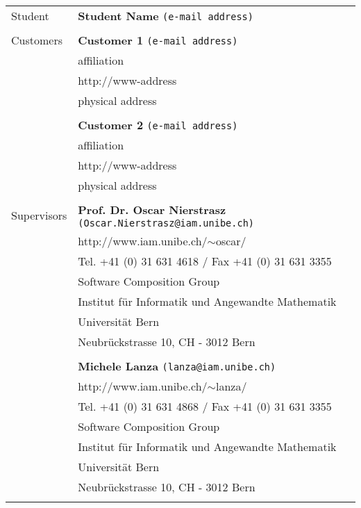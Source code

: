 \documentclass[10pt]{article}
\begin{document}
\begin{table}[ht]
\begin{tabular}{p{3cm}p{12cm}}
Student               & {\bf Student Name} {\tt (e-mail address)}\\
                      & \\
Customers             & {\bf Customer 1} {\tt (e-mail address)}\\
                      & affiliation\\
                      & http://www-address\\
                      & physical address\\
                      & \\
                      & {\bf Customer 2} {\tt (e-mail address)}\\
                      & affiliation\\
                      & http://www-address\\
                      & physical address\\
                      & \\    
Supervisors           & {\bf Prof. Dr. Oscar Nierstrasz} {\tt (Oscar.Nierstrasz@iam.unibe.ch)}\\ 
                      & http://www.iam.unibe.ch/$\sim$oscar/\\
                      & Tel. +41 (0) 31 631 4618 / Fax +41 (0) 31 631 3355\\
                      & Software Composition Group\\
                      & Institut f\"ur Informatik und Angewandte Mathematik\\
                      & Universit\"at Bern\\
                      & Neubr\"{u}ckstrasse 10, CH - 3012 Bern\\
                      & \\
                      & {\bf Michele Lanza} {\tt (lanza@iam.unibe.ch)}\\ 
                      & http://www.iam.unibe.ch/$\sim$lanza/\\
                      & Tel. +41 (0) 31 631 4868 / Fax +41 (0) 31 631 3355\\
                      & Software Composition Group\\
                      & Institut f\"ur Informatik und Angewandte Mathematik\\
                      & Universit\"at Bern\\
                      & Neubr\"{u}ckstrasse 10, CH - 3012 Bern\\
                      & \\
\end{tabular}
\end{table}
\end{document}

